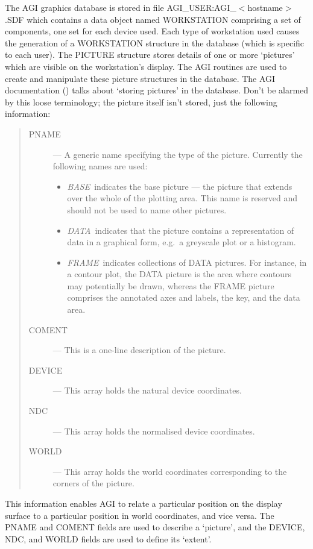 The AGI graphics database is stored in file AGI\_USER:AGI\_$<$hostname$>$.SDF
which contains a data object named WORKSTATION comprising a set of components,
one set for each device used.
Each type of workstation used causes the generation of a WORKSTATION structure
in the database (which is specific to each user).
The PICTURE structure stores details of one or more `pictures' which are
visible on the workstation's display.
The AGI routines are used to create and manipulate these picture structures in
the database.
The AGI documentation () talks about `storing pictures'
in the database.
Don't be alarmed by this loose terminology; the picture itself isn't stored,
just the following information:
\begin{quote}
\begin{description}
\item [PNAME] ---
A generic name specifying the type of the picture.
Currently the following names are used:
\begin{itemize}
\item {\em BASE}\, indicates the base picture --- the picture that extends
 over the  whole of  the plotting area. 
 This name is reserved and should not be used to name other pictures.
\item {\em DATA}\, indicates that the picture contains a representation of
 data in a graphical form, e.g.\ a greyscale plot or a histogram.
\item {\em FRAME}\, indicates collections of DATA pictures.
 For instance, in a contour plot, the DATA picture is the area where contours
 may  potentially be drawn, whereas the FRAME picture comprises the annotated
 axes and labels, the key, and the data area.
\end{itemize}
\item [COMENT] ---
 This is a one-line description of the picture.
\item [DEVICE] ---
 This array holds the natural device coordinates.
\item [NDC] ---
 This array holds the normalised device coordinates.
\item [WORLD] ---
 This array holds the world coordinates corresponding to the corners of the
 picture.
\end{description}
\end{quote}
This information enables AGI to relate a particular position on the display
surface to a particular position in world coordinates, and vice versa.
The PNAME and COMENT fields are used to describe a `picture', and the DEVICE,
NDC, and WORLD fields are used to define its `extent'.

